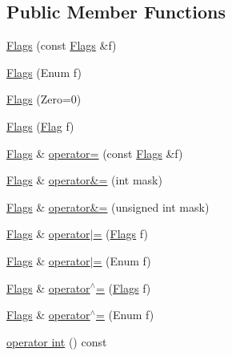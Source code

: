 \subsection*{Public Member Functions}
\begin{DoxyCompactItemize}
\item 
\hyperlink{classprism_1_1utils_1_1_flags_a3fafb8acbd195066172ebd1d77994da1}{Flags} (const \hyperlink{classprism_1_1utils_1_1_flags}{Flags} \&f)
\item 
\hyperlink{classprism_1_1utils_1_1_flags_a1cf2c9a4de2ffe4fe6f21efc01a31d31}{Flags} (Enum f)
\item 
\hyperlink{classprism_1_1utils_1_1_flags_a1da07ee76e339720a0df2a3f29902c3e}{Flags} (Zero=0)
\item 
\hyperlink{classprism_1_1utils_1_1_flags_ae0d86a57d3ed16407ae92de22f246eb4}{Flags} (\hyperlink{classprism_1_1utils_1_1_flag}{Flag} f)
\item 
\hyperlink{classprism_1_1utils_1_1_flags}{Flags} \& \hyperlink{classprism_1_1utils_1_1_flags_a0f912e256f4e552c5bb59444c2b18ef5}{operator=} (const \hyperlink{classprism_1_1utils_1_1_flags}{Flags} \&f)
\item 
\hyperlink{classprism_1_1utils_1_1_flags}{Flags} \& \hyperlink{classprism_1_1utils_1_1_flags_a82f1bad45e06f130fefc7bfcf94c597f}{operator\&=} (int mask)
\item 
\hyperlink{classprism_1_1utils_1_1_flags}{Flags} \& \hyperlink{classprism_1_1utils_1_1_flags_a55c97993c6a3a0fdaad1d4883c65d968}{operator\&=} (unsigned int mask)
\item 
\hyperlink{classprism_1_1utils_1_1_flags}{Flags} \& \hyperlink{classprism_1_1utils_1_1_flags_acd806486124bf28982a72e3bbebd554a}{operator$\vert$=} (\hyperlink{classprism_1_1utils_1_1_flags}{Flags} f)
\item 
\hyperlink{classprism_1_1utils_1_1_flags}{Flags} \& \hyperlink{classprism_1_1utils_1_1_flags_a5511bcaf57aa1e07d804e5492312769a}{operator$\vert$=} (Enum f)
\item 
\hyperlink{classprism_1_1utils_1_1_flags}{Flags} \& \hyperlink{classprism_1_1utils_1_1_flags_ac88df39eb6f933e0be935c0e4f789995}{operator$^\wedge$=} (\hyperlink{classprism_1_1utils_1_1_flags}{Flags} f)
\item 
\hyperlink{classprism_1_1utils_1_1_flags}{Flags} \& \hyperlink{classprism_1_1utils_1_1_flags_a101b0466587350dccfdd5f20b865c764}{operator$^\wedge$=} (Enum f)
\item 
\hyperlink{classprism_1_1utils_1_1_flags_af1a90419fc3644502efbb01d92bfea05}{operator int} () const 

\end{DoxyCompactItemize}
